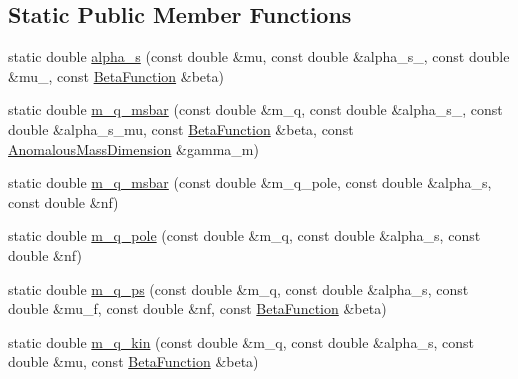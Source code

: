 \subsection*{Static Public Member Functions}
\begin{DoxyCompactItemize}
\item 
static double \hyperlink{classeos_1_1QCD_a65cf274c0bcedec2189f6836eebb4a7a}{alpha\_\-s} (const double \&mu, const double \&alpha\_\-s\_, const double \&mu\_, const \hyperlink{classeos_1_1QCD_a1261bb4643fea3012beb0a9ea78b7dea}{BetaFunction} \&beta)
\item 
static double \hyperlink{classeos_1_1QCD_ad982972648053f9f5a7e41ec73e07346}{m\_\-q\_\-msbar} (const double \&m\_\-q, const double \&alpha\_\-s\_, const double \&alpha\_\-s\_\-mu, const \hyperlink{classeos_1_1QCD_a1261bb4643fea3012beb0a9ea78b7dea}{BetaFunction} \&beta, const \hyperlink{classeos_1_1QCD_a3ca5eea2df0bd5c0043071e14c58d089}{AnomalousMassDimension} \&gamma\_\-m)
\item 
static double \hyperlink{classeos_1_1QCD_a8b164d1c0acdf564198a3535539f281f}{m\_\-q\_\-msbar} (const double \&m\_\-q\_\-pole, const double \&alpha\_\-s, const double \&nf)
\item 
static double \hyperlink{classeos_1_1QCD_a1cd4a3d09f464732fd0639319f53c8ab}{m\_\-q\_\-pole} (const double \&m\_\-q, const double \&alpha\_\-s, const double \&nf)
\item 
static double \hyperlink{classeos_1_1QCD_a09637e36c232414e489bf75faa359e5d}{m\_\-q\_\-ps} (const double \&m\_\-q, const double \&alpha\_\-s, const double \&mu\_\-f, const double \&nf, const \hyperlink{classeos_1_1QCD_a1261bb4643fea3012beb0a9ea78b7dea}{BetaFunction} \&beta)
\item 
static double \hyperlink{classeos_1_1QCD_ad4ddd12454ebee7271a0245b9fbabdfa}{m\_\-q\_\-kin} (const double \&m\_\-q, const double \&alpha\_\-s, const double \&mu, const \hyperlink{classeos_1_1QCD_a1261bb4643fea3012beb0a9ea78b7dea}{BetaFunction} \&beta)
\end{DoxyCompactItemize}
